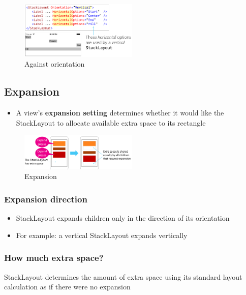 \documentclass{article}
\newcommand{\bold}[1]{\textbf{#1}}
\begin{document}
\begin{figure}[H]
    \centering
    \includegraphics[width=0.5\textwidth]{xaml-stacklayout-orientation2.png}
    \caption{Against orientation}
\end{figure}


\subsection{Expansion}

\begin{itemize}
    \item A view's \bold{expansion setting} determines whether it would like the StackLayout to allocate available extra space to its rectangle
\end{itemize}

\begin{figure}[H]
    \centering
    \includegraphics[width=0.5\textwidth]{xaml-expansion.png}
    \caption{Expansion}
\end{figure}

\subsubsection{Expansion direction}

\begin{itemize}
    \item StackLayout expands children only in the direction of its orientation
    \item For example: a vertical StackLayout expands vertically
\end{itemize}

\subsubsection{How much extra space?}

StackLayout determines the amount of extra space using its standard layout calculation as if there were no expansion
\end{document}
